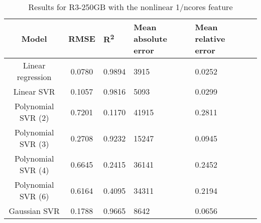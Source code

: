 \begin{table}[H]
\centering
\begin{adjustbox}{center}
\begin{tabular}{c | c M{1.2cm} M{2.5cm} M{2.5cm} M{1.8cm}}
Model & RMSE & R\textsuperscript{2} & Mean absolute error & Mean relative error \tabularnewline
\hline
Linear regression & 0.0780 & 0.9894 &   3915 & 0.0252 \\
Linear SVR & 0.1057 & 0.9816 &   5093 & 0.0299 \\
Polynomial SVR (2) & 0.7201 & 0.1170 &  41915 & 0.2811 \\
Polynomial SVR (3) & 0.2708 & 0.9232 &  15247 & 0.0945 \\
Polynomial SVR (4) & 0.6645 & 0.2415 &  36141 & 0.2452 \\
Polynomial SVR (6) & 0.6164 & 0.4095 &  34311 & 0.2194 \\
Gaussian SVR & 0.1788 & 0.9665 &   8642 & 0.0656 \\
\end{tabular}
\end{adjustbox}
\\
\caption{Results for R3-250GB with the nonlinear 1/ncores feature}
\label{tab:all_nonlinear_R3_250}
\end{table}
